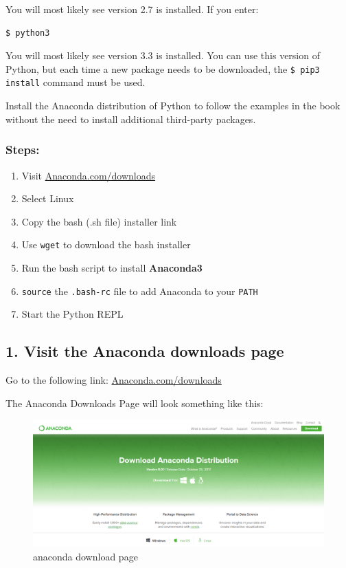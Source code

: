 \documentclass{book}
\makeatletter
\def\maxwidth{\ifdim\Gin@nat@width>\linewidth\linewidth
    \else\Gin@nat@width\fi}
\let\Oldincludegraphics\includegraphics
\renewcommand{\includegraphics}[1]{\Oldincludegraphics[width=.8\maxwidth]{#1}}
\makeatother
\begin{document}
You will most likely see version 2.7 is installed. If you enter:

\begin{lstlisting}
$ python3
\end{lstlisting}

You will most likely see version 3.3 is installed. You can use this
version of Python, but each time a new package needs to be downloaded,
the \lstinline!$ pip3 install! command must be used.

Install the Anaconda distribution of Python to follow the examples in
the book without the need to install additional third-party packages.

    \subsubsection{Steps:}\label{steps}

\begin{enumerate}
\def\labelenumi{\arabic{enumi}.}
\item
  Visit
  \href{https://www.anaconda.com/download/}{Anaconda.com/downloads}
\item
  Select Linux
\item
  Copy the bash (.sh file) installer link
\item
  Use \lstinline!wget! to download the bash installer
\item
  Run the bash script to install \textbf{Anaconda3}
\item
  \lstinline!source! the \lstinline!.bash-rc! file to add Anaconda to
  your \lstinline!PATH!
\item
  Start the Python REPL
\end{enumerate}

    \subsection{1. Visit the Anaconda downloads
page}\label{visit-the-anaconda-downloads-page}

Go to the following link:
\href{https://www.anaconda.com/download/}{Anaconda.com/downloads}

The Anaconda Downloads Page will look something like this:

\begin{figure}
\centering
\includegraphics{images/anaconda_download_page.png}
\caption{anaconda download page}
\end{figure}
\end{document}
